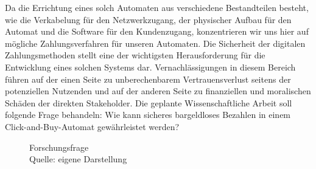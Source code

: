 Da die Errichtung eines solch Automaten aus verschiedene Bestandteilen besteht, wie die Verkabelung 
für den Netzwerkzugang, der physischer Aufbau für den Automat und die Software für den Kundenzugang, 
konzentrieren wir uns hier auf mögliche Zahlungsverfahren für unseren Automaten. Die Sicherheit der 
digitalen Zahlungsmethoden stellt eine der wichtigsten Herausforderung für die Entwicklung eines 
solchen Systems dar. Vernachlässigungen in diesem Bereich führen auf der einen Seite zu unberechenbarem
Vertrauensverlust seitens der potenziellen Nutzenden und auf der anderen Seite zu finanziellen und 
moralischen Schäden der direkten Stakeholder. Die geplante Wissenschaftliche Arbeit soll folgende 
Frage behandeln: Wie kann sicheres bargeldloses Bezahlen in einem Click-and-Buy-Automat gewährleistet
werden? 

\vspace*{1cm}
\begin{figure}[H]
    \caption{Forschungsfrage \\ Quelle: eigene Darstellung}
    \label{fig:diagramrecherche}
\end{figure}